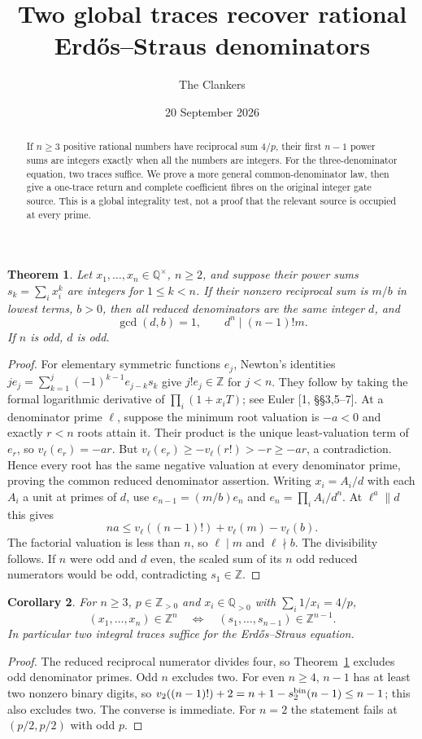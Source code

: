 \documentclass[10pt]{article}
\title{Two global traces recover rational Erd\H{o}s--Straus denominators}
\author{The Clankers}
\date{20 September 2026}
\newcommand{\Q}{\mathbb Q}\newcommand{\Z}{\mathbb Z}
\newtheorem{theorem}{Theorem}\newtheorem{corollary}[theorem]{Corollary}
\begin{document}
\maketitle
\begin{abstract}
If $n\ge3$ positive rational numbers have reciprocal sum $4/p$, their first
$n-1$ power sums are integers exactly when all the numbers are integers. For the
three-denominator equation, two traces suffice. We prove a more general
common-denominator law, then give a one-trace return and complete coefficient
fibres on the original integer gate source. This is a global integrality test,
not a proof that the relevant source is occupied at every prime.
\end{abstract}

\begin{theorem}\label{th:den}
Let $x_1,\ldots,x_n\in\Q^\times$, $n\ge2$, and suppose their power sums
$s_k=\sum_i x_i^k$ are integers for $1\le k<n$. If their nonzero reciprocal sum is
$m/b$ in lowest terms, $b>0$, then all reduced denominators are the same integer
$d$, and
\[
 \boxed{\gcd(d,b)=1,\qquad d^n\mid(n-1)!m.}
\]
If $n$ is odd, $d$ is odd.
\end{theorem}
\begin{proof}
For elementary symmetric functions $e_j$, Newton's identities
$j e_j=\sum_{k=1}^j(-1)^{k-1}e_{j-k}s_k$ give $j!e_j\in\Z$ for $j<n$.
They follow by taking the formal logarithmic derivative of
$\prod_i(1+x_iT)$; see Euler [1, \S\S3,5--7].
At a denominator prime $\ell$, suppose the minimum root valuation is $-a<0$
and exactly $r<n$ roots attain it. Their product is the unique least-valuation
term of $e_r$, so $v_\ell(e_r)=-ar$. But
$v_\ell(e_r)\ge-v_\ell(r!)>-r\ge-ar$, a contradiction. Hence every root has
the same negative valuation at every denominator prime, proving the common
reduced denominator assertion.
Writing $x_i=A_i/d$ with each $A_i$ a unit at primes of $d$, use
$e_{n-1}=(m/b)e_n$ and $e_n=\prod_iA_i/d^n$. At $\ell^a\parallel d$ this gives
\[
 na\le v_\ell((n-1)!)+v_\ell(m)-v_\ell(b).
\]
The factorial valuation is less than $n$, so $\ell\mid m$ and $\ell\nmid b$.
The divisibility follows. If $n$ were odd and $d$ even, the scaled sum of its
$n$ odd reduced numerators would be odd, contradicting $s_1\in\Z$.
\end{proof}

\begin{corollary}\label{cor:es}
For $n\ge3$, $p\in\Z_{>0}$ and $x_i\in\Q_{>0}$ with $\sum_i1/x_i=4/p$,
\[
 \boxed{(x_1,\ldots,x_n)\in\Z^n
 \quad\Longleftrightarrow\quad(s_1,\ldots,s_{n-1})\in\Z^{n-1}.}
\]
In particular two integral traces suffice for the Erd\H{o}s--Straus equation.
\end{corollary}
\begin{proof}
The reduced reciprocal numerator divides four, so Theorem~\ref{th:den} excludes
odd denominator primes. Odd $n$ excludes two. For even $n\ge4$, $n-1$ has at
least two nonzero binary digits, so
$v_2((n-1)!)+2=n+1-s_2^{\rm bin}(n-1)\le n-1$; this also excludes two.
The converse is immediate. For $n=2$ the statement fails at $(p/2,p/2)$ with odd $p$.
\end{proof}
\end{document}
